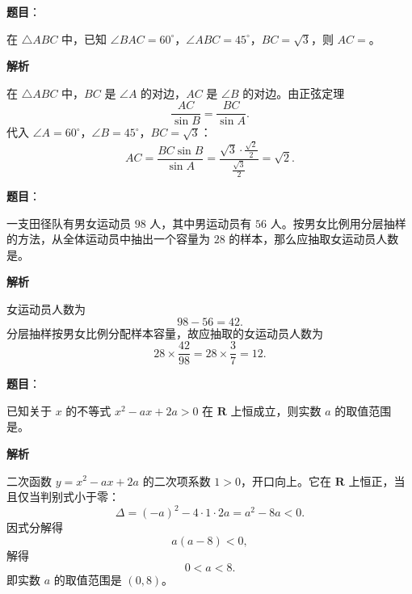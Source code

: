 \begin{answer}

\textbf{题目}：

在 $\triangle ABC$ 中，已知 $\angle BAC=60^\circ$，$\angle ABC=45^\circ$，$BC=\sqrt3$，则 $AC=$\gkblank{}。

\textbf{解析}

在 $\triangle ABC$ 中，$BC$ 是 $\angle A$ 的对边，$AC$ 是 $\angle B$ 的对边。由正弦定理
\nopagebreak[4]
\[\frac{AC}{\sin B}=\frac{BC}{\sin A}.\]
代入 $\angle A=60^\circ$，$\angle B=45^\circ$，$BC=\sqrt3$：
\nopagebreak[4]
\[AC=\frac{BC\sin B}{\sin A}
=\frac{\sqrt3\cdot\frac{\sqrt2}{2}}{\frac{\sqrt3}{2}}
=\sqrt2.\]


\end{answer}
\begin{answer}

\textbf{题目}：

一支田径队有男女运动员 $98$ 人，其中男运动员有 $56$ 人。按男女比例用分层抽样的方法，从全体运动员中抽出一个容量为 $28$ 的样本，那么应抽取女运动员人数是\gkblank{}。

\textbf{解析}

女运动员人数为
\nopagebreak[4]
\[98-56=42.\]
分层抽样按男女比例分配样本容量，故应抽取的女运动员人数为
\nopagebreak[4]
\[28\times\frac{42}{98}=28\times\frac37=12.\]


\end{answer}
\begin{answer}

\textbf{题目}：

已知关于 $x$ 的不等式 $x^2-ax+2a>0$ 在 $\mathbf R$ 上恒成立，则实数 $a$ 的取值范围是\gkblank{}。

\textbf{解析}

二次函数 $y=x^2-ax+2a$ 的二次项系数 $1>0$，开口向上。它在 $\mathbf R$ 上恒正，当且仅当判别式小于零：
\nopagebreak[4]
\[\Delta=(-a)^2-4\cdot1\cdot2a=a^2-8a<0.\]
因式分解得
\nopagebreak[4]
\[a(a-8)<0,\]
解得
\nopagebreak[4]
\[0<a<8.\]
即实数 $a$ 的取值范围是 $(0,8)$。


\end{answer}
